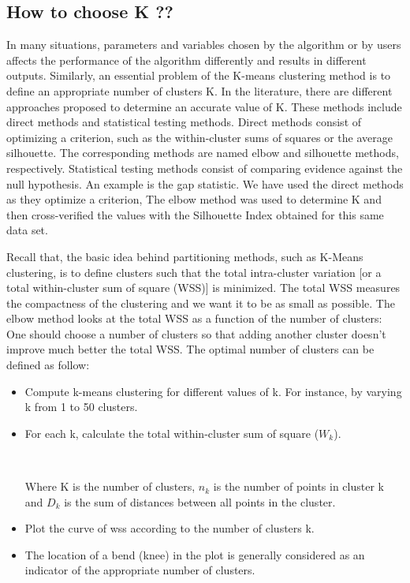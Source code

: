 \subsection{How to choose K ??}
 In many situations, parameters and variables chosen by the algorithm or by users affects the performance of the algorithm differently and results in different outputs. Similarly, an essential problem of the K-means clustering method is to define an appropriate number of clusters K. In the literature, there are different approaches proposed to determine an accurate value of K.
 These methods include direct methods and statistical testing methods. Direct methods consist of optimizing a criterion, such as the within-cluster sums of squares or the average silhouette. The corresponding methods are named elbow and silhouette methods, respectively. Statistical testing methods consist of comparing evidence against the null hypothesis. An example is the gap statistic. We have used the direct methods as they optimize a criterion, The elbow method was used to determine K and then cross-verified the values with the Silhouette Index obtained for this same data set.
 
 Recall that, the basic idea behind partitioning methods, such as K-Means clustering, is to define clusters such that the total intra-cluster variation [or a total within-cluster sum of square (WSS)] is minimized. The total WSS measures the compactness of the clustering and we want it to be as small as possible. The elbow method looks at the total WSS as a function of the number of clusters: One should choose a number of clusters so that adding another cluster doesn't improve much better the total WSS. 
 The optimal number of clusters can be defined as follow:
 \begin{itemize}
 	\item Compute k-means clustering for different values of k. For instance, by varying k from 1 to 50 clusters.
 	
 	\item For each k, calculate the total within-cluster sum of square ($W_k$).
 	\begin{center}
 	 		 \\
 	 	
 	 	
 	\end{center}  
    Where K is the number of clusters, $n_k$ is the number of points in cluster k and $D_k$ is the sum of distances between all points in the cluster.
 	\item Plot the curve of wss according to the number of clusters k. 	
 	\item The location of a bend (knee) in the plot is generally considered as an indicator of the appropriate number of clusters.
 \end{itemize}

